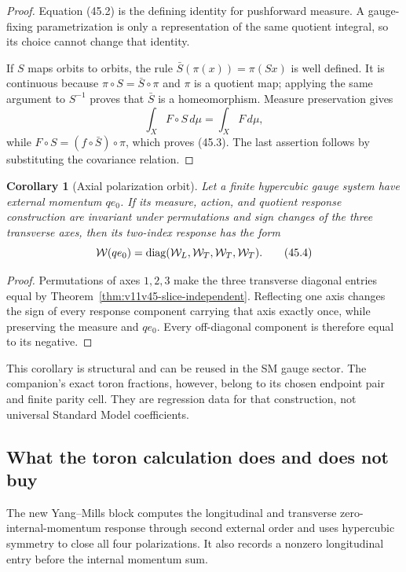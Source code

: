 \documentclass[11pt]{article}
\newtheorem{corollary}[theorem]{Corollary}
\begin{document}
\begin{proof}
Equation (45.2) is the defining identity for pushforward measure.
A gauge-fixing parametrization is only a representation of the same
quotient integral, so its choice cannot change that identity.

If \(S\) maps orbits to orbits, the rule
\(\bar S(\pi(x))=\pi(Sx)\) is well defined.  It is continuous because
\(\pi\circ S=\bar S\circ\pi\) and \(\pi\) is a quotient map; applying
the same argument to \(S^{-1}\) proves that \(\bar S\) is a
homeomorphism.  Measure preservation gives
\[
 \int_X F\circ S\,d\mu=\int_X F\,d\mu,
\]
while \(F\circ S=(f\circ\bar S)\circ\pi\), which proves (45.3).
The last assertion follows by substituting the covariance relation.
\end{proof}

\begin{corollary}[Axial polarization orbit]
\label{cor:v11v45-polarization}
Let a finite hypercubic gauge system have external momentum \(q e_0\).
If its measure, action, and quotient response construction are
invariant under permutations and sign changes of the three transverse
axes, then its two-index response has the form
\[
       {\cal W}(q e_0)
       =\operatorname{diag}({\cal W}_L,{\cal W}_T,
                            {\cal W}_T,{\cal W}_T).             \tag{45.4}
\]
\end{corollary}

\begin{proof}
Permutations of axes \(1,2,3\) make the three transverse diagonal
entries equal by Theorem~\ref{thm:v11v45-slice-independent}.  Reflecting
one axis changes the sign of every response component carrying that
axis exactly once, while preserving the measure and \(q e_0\).
Every off-diagonal component is therefore equal to its negative.
\end{proof}

This corollary is structural and can be reused in the SM gauge sector.
The companion's exact toron fractions, however, belong to its chosen
endpoint pair and finite parity cell.  They are regression data for
that construction, not universal Standard Model coefficients.

\subsection{What the toron calculation does and does not buy}

The new Yang--Mills block computes the longitudinal and transverse
zero-internal-momentum response through second external order and uses
hypercubic symmetry to close all four polarizations.  It also records
a nonzero longitudinal entry before the internal momentum sum.
\end{document}
